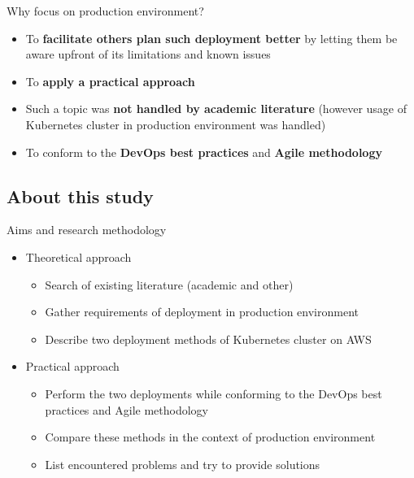 \documentclass{beamer}
\begin{document}
\begin{frame}{Why focus on production environment?}%
	\begin{itemize}
		\item To \textbf{facilitate others plan such deployment better} by letting them be aware upfront of its limitations and known issues
		\item To \textbf{apply a practical approach}
		\item Such a topic was \textbf{not handled by academic literature} (however usage of Kubernetes cluster in production environment was handled)
		\item To conform to the \textbf{DevOps best practices} and \textbf{Agile methodology}
	\end{itemize}
\end{frame}

\subsection{About this study}
\begin{frame}{Aims and research methodology}%
	\begin{itemize}
		\item Theoretical approach
		\begin{itemize}
			\item Search of existing literature (academic and other)
			\item Gather requirements of deployment in production environment
			\item Describe two deployment methods of Kubernetes cluster on AWS
		\end{itemize}
		\item Practical approach
		\begin{itemize}
			\item Perform the two deployments while conforming to the DevOps best practices and Agile methodology
			\item Compare these methods in the context of production environment
			\item List encountered problems and try to provide solutions
		\end{itemize}
	\end{itemize}
\end{frame}
\end{document}
